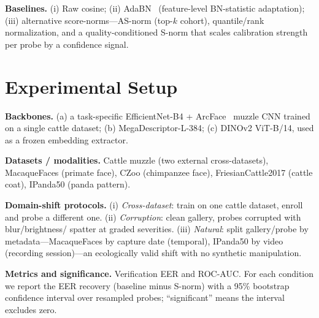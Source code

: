\documentclass[conference]{IEEEtran}
\begin{document}
\textbf{Baselines.} (i) Raw cosine; (ii) AdaBN~\cite{li2017} (feature-level BN-statistic adaptation);
(iii) alternative score-norms---AS-norm (top-$k$ cohort), quantile/rank normalization, and a
quality-conditioned S-norm that scales calibration strength per probe by a confidence signal.

\section{Experimental Setup}
\textbf{Backbones.} (a) a task-specific EfficientNet-B4 + ArcFace~\cite{deng2019} muzzle CNN trained
on a single cattle dataset; (b) MegaDescriptor-L-384; (c) DINOv2 ViT-B/14, used as a frozen embedding
extractor.

\textbf{Datasets / modalities.} Cattle muzzle (two external cross-datasets), MacaqueFaces (primate
face), CZoo (chimpanzee face), FriesianCattle2017 (cattle coat), IPanda50 (panda pattern).

\textbf{Domain-shift protocols.} (i) \emph{Cross-dataset}: train on one cattle dataset, enroll and
probe a different one. (ii) \emph{Corruption}: clean gallery, probes corrupted with blur/brightness/
spatter at graded severities. (iii) \emph{Natural}: split gallery/probe by metadata---MacaqueFaces by
capture date (temporal), IPanda50 by video (recording session)---an ecologically valid shift with no
synthetic manipulation.

\textbf{Metrics and significance.} Verification EER and ROC-AUC. For each condition we report the EER
recovery (baseline minus S-norm) with a 95\% bootstrap confidence interval over resampled probes;
``significant'' means the interval excludes zero.
\end{document}
